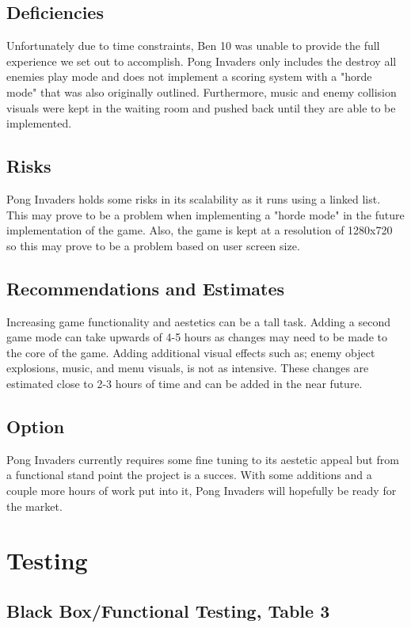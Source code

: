 \documentclass[12pt, oneside]{article}
\begin{document}
\subsection{Deficiencies}
Unfortunately due to time constraints, Ben 10 was unable to provide the full experience we set out to accomplish. Pong Invaders only includes the destroy all enemies play mode and does not implement a scoring system with a "horde mode" that was also originally outlined. Furthermore, music and enemy collision visuals were kept in the waiting room and pushed back until they are able to be implemented. 

\subsection{Risks}
Pong Invaders holds some risks in its scalability as it runs using a linked list. This may prove to be a problem when implementing a "horde mode" in the future implementation of the game. Also, the game is kept at a resolution of 1280x720 so this may prove to be a problem based on user screen size.

\subsection{Recommendations and Estimates}
Increasing game functionality and aestetics can be a tall task. Adding a second game mode can take upwards of 4-5 hours as changes may need to be made to the core of the game. Adding additional visual effects such as; enemy object explosions, 
music, and menu visuals, is not as intensive. These changes are estimated close to 2-3 hours of time and can be added in the near
future. 

\subsection{Option}
Pong Invaders currently requires some fine tuning to its aestetic appeal but from a functional stand point the project is a succes. 
With some additions and a couple more hours of work put into it, Pong Invaders will hopefully be ready for the market.

\section{Testing}

\subsection{Black Box/Functional Testing, Table 3}
\end{document}
